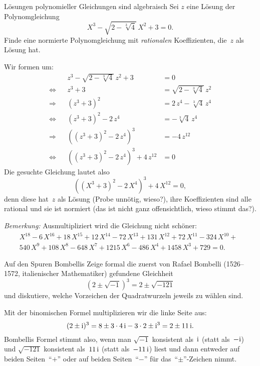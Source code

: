 \documentclass{algblatt}
\begin{document}
\vspace*{-1.2cm}

\begin{aufgabe}{Lösungen polynomieller Gleichungen sind algebraisch}
Sei $z$ eine Lösung der Polynomgleichung
\[ X^3 - \sqrt{2 - \sqrt[3]{4}} \, X^2 + 3 = 0. \]
Finde eine normierte Polynomgleichung mit \emph{rationalen} Koeffizienten,
die~$z$ als Lösung hat.
\begin{loesung}
Wir formen um:
\begin{align*}
  &&z^3 - \sqrt{2 - \sqrt[3]{4}} \, z^2 + 3 &= 0 \\
  \Longleftrightarrow&&
  z^3 + 3 &= \sqrt{2 - \sqrt[3]{4}} \, z^2 \\
  \Longrightarrow&&
  (z^3 + 3)^2 &= 2 \, z^4 - \sqrt[3]{4} \, z^4 \\
  \Longleftrightarrow&&
  (z^3 + 3)^2 - 2 \, z^4 &= -\sqrt[3]{4} \, z^4 \\
  \Longrightarrow&&
  ((z^3 + 3)^2 - 2 \, z^4)^3 &= -4 \, z^{12} \\
  \Longleftrightarrow&&
  ((z^3 + 3)^2 - 2 \, z^4)^3 + 4 \, z^{12} &= 0
\end{align*}
Die gesuchte Gleichung lautet also
\[ ((X^3 + 3)^2 - 2 \, X^4)^3 + 4 \, X^{12} = 0, \]
denn diese hat~$z$ als Lösung (Probe unnötig, wieso?), ihre Koeffizienten sind
alle rational und sie ist normiert (das ist nicht ganz offensichtlich, wieso
stimmt das?).

\emph{Bemerkung:} Ausmultipliziert wird die Gleichung nicht schöner:
\begin{multline*}
X^{18}-6\,X^{16}+18\,X^{15}+12\,X^{14}-72\,X^{13}+131\,X^{12}+72\,X^{11}-324\,X^{10}+\phantom{0}\\
    540\,X^{9}+108\,X^{8}-648\,X^{7}+1215\,X^{6}-486\,X^{4}+1458\,X^{3}+729=0.
\end{multline*}
\end{loesung}
\end{aufgabe}

\begin{aufgabe}{Auf den Spuren Bombellis}
Zeige formal die zuerst von Rafael Bombelli (1526--1572, italienischer
Mathematiker) gefundene
Gleichheit
\[
    (2 \pm \sqrt{-1})^3 = 2 \pm \sqrt{-121}
\]
und diskutiere, welche Vorzeichen der Quadratwurzeln jeweils zu wählen sind.
\begin{loesung}
Mit der binomischen Formel multiplizieren wir die linke Seite aus:
\[ (2 \pm \mathrm{i})^3 = 8 \pm 3 \cdot 4 \, \mathrm{i} - 3 \cdot 2 \pm \mathrm{i}^3 =
  2 \pm 11 \, \mathrm{i}. \]
Bombellis Formel stimmt also, wenn man $\sqrt{-1}$ konsistent als~$\mathrm{i}$ (statt
als~$-\mathrm{i}$) und $\sqrt{-121}$ konsistent als~$11 \,\mathrm{i}$ (statt als~$-11\,\mathrm{i}$)
liest und dann entweder auf beiden Seiten~"`$+$"' oder auf beiden Seiten~"`$-$"' für
das~"`$\pm$"'-Zeichen nimmt.
\end{loesung}
\end{aufgabe}
\end{document}
